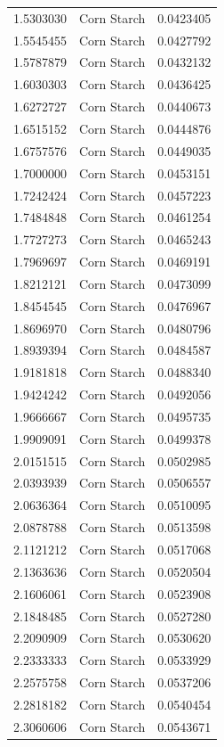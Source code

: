 \documentclass[
  12pt,
]{article}
\begin{document}
{\begin{longtable}[]{@{}rlr@{}}
1.5303030 & Corn Starch & 0.0423405 \\
1.5545455 & Corn Starch & 0.0427792 \\
1.5787879 & Corn Starch & 0.0432132 \\
1.6030303 & Corn Starch & 0.0436425 \\
1.6272727 & Corn Starch & 0.0440673 \\
1.6515152 & Corn Starch & 0.0444876 \\
1.6757576 & Corn Starch & 0.0449035 \\
1.7000000 & Corn Starch & 0.0453151 \\
1.7242424 & Corn Starch & 0.0457223 \\
1.7484848 & Corn Starch & 0.0461254 \\
1.7727273 & Corn Starch & 0.0465243 \\
1.7969697 & Corn Starch & 0.0469191 \\
1.8212121 & Corn Starch & 0.0473099 \\
1.8454545 & Corn Starch & 0.0476967 \\
1.8696970 & Corn Starch & 0.0480796 \\
1.8939394 & Corn Starch & 0.0484587 \\
1.9181818 & Corn Starch & 0.0488340 \\
1.9424242 & Corn Starch & 0.0492056 \\
1.9666667 & Corn Starch & 0.0495735 \\
1.9909091 & Corn Starch & 0.0499378 \\
2.0151515 & Corn Starch & 0.0502985 \\
2.0393939 & Corn Starch & 0.0506557 \\
2.0636364 & Corn Starch & 0.0510095 \\
2.0878788 & Corn Starch & 0.0513598 \\
2.1121212 & Corn Starch & 0.0517068 \\
2.1363636 & Corn Starch & 0.0520504 \\
2.1606061 & Corn Starch & 0.0523908 \\
2.1848485 & Corn Starch & 0.0527280 \\
2.2090909 & Corn Starch & 0.0530620 \\
2.2333333 & Corn Starch & 0.0533929 \\
2.2575758 & Corn Starch & 0.0537206 \\
2.2818182 & Corn Starch & 0.0540454 \\
2.3060606 & Corn Starch & 0.0543671 \\

\end{longtable}}
\end{document}
